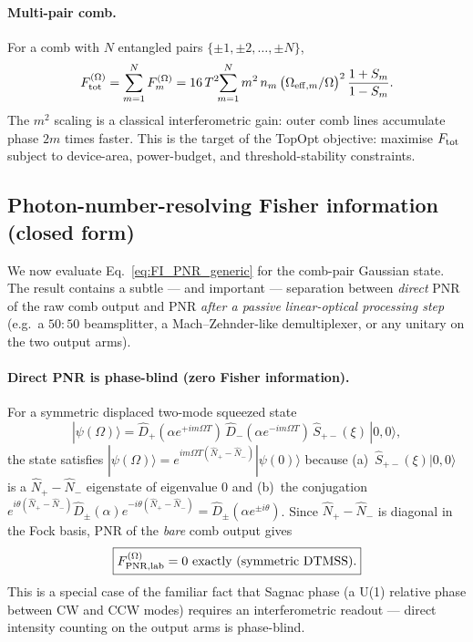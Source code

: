 \documentclass[11pt]{article}
\newcommand{\eff}{{\rm eff}}
\begin{document}
\paragraph{Multi-pair comb.}  For a comb with $N$ entangled pairs
$\{\pm 1,\pm 2,\ldots,\pm N\}$,
\begin{equation}
  F_{\rm tot}^{(\Omega)} = \sum_{m=1}^N F_m^{(\Omega)}
  = 16\, T^2\!\!\sum_{m=1}^N m^2\,n_m\,\bigl(\Omega_{\eff,m}/\Omega\bigr)^2
    \,\frac{1+S_m}{1-S_m}.
  \label{eq:F_tot}
\end{equation}
The $m^2$ scaling is a classical interferometric gain: outer comb
lines accumulate phase $2m$ times faster.  This is the target of the
TopOpt objective: maximise $F_{\rm tot}$ subject to device-area,
power-budget, and threshold-stability constraints.

\subsection{Photon-number-resolving Fisher information (closed form)}
\label{sec:PNR_FI}

We now evaluate Eq.~\eqref{eq:FI_PNR_generic} for the comb-pair
Gaussian state.  The result contains a subtle --- and important ---
separation between \emph{direct} PNR of the raw comb output and
PNR \emph{after a passive linear-optical processing step} (e.g.\ a
$50{:}50$ beamsplitter, a Mach--Zehnder-like demultiplexer, or any
unitary on the two output arms).

\paragraph{Direct PNR is phase-blind (zero Fisher information).}
For a symmetric displaced two-mode squeezed state
\begin{equation}
  |\psi(\Omega)\rangle
  = \hat D_+(\alpha e^{+i m\Omega T})\,\hat D_-(\alpha e^{-i m\Omega T})\,
    \hat S_{+-}(\xi)\,|0,0\rangle,
  \label{eq:symDTMSS}
\end{equation}
the state satisfies
$|\psi(\Omega)\rangle = e^{i m\Omega T(\hat N_+ - \hat N_-)}
|\psi(0)\rangle$ because (a)~$\hat S_{+-}(\xi)|0,0\rangle$ is a
$\hat N_+ - \hat N_-$ eigenstate of eigenvalue $0$ and (b)~the
conjugation $e^{i\theta(\hat N_+-\hat N_-)}\hat D_\pm(\alpha)
e^{-i\theta(\hat N_+-\hat N_-)} = \hat D_\pm(\alpha e^{\pm i\theta})$.
Since $\hat N_+ - \hat N_-$ is diagonal in the Fock basis, PNR of the
\emph{bare} comb output gives
\begin{equation}
  \boxed{
    F_{\rm PNR,lab}^{(\Omega)} = 0\ \text{exactly (symmetric DTMSS).}}
  \label{eq:F_PNR_lab_zero}
\end{equation}
This is a special case of the familiar fact that Sagnac phase (a
U(1) relative phase between CW and CCW modes) requires an
interferometric readout --- direct intensity counting on the output
arms is phase-blind.
\end{document}
